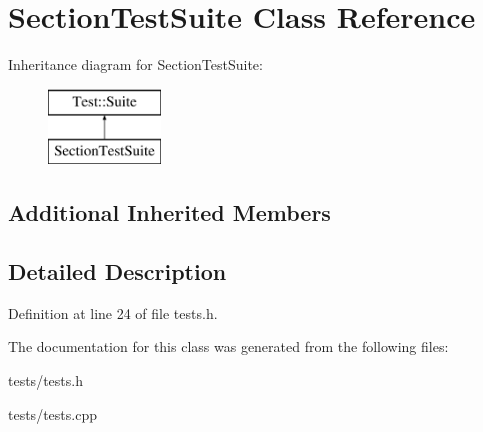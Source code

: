 \hypertarget{class_section_test_suite}{}\section{Section\+Test\+Suite Class Reference}
\label{class_section_test_suite}
Inheritance diagram for Section\+Test\+Suite\+:\begin{figure}[H]
\begin{center}
\leavevmode
\includegraphics[height=2.000000cm]{class_section_test_suite}
\end{center}
\end{figure}
\subsection*{Additional Inherited Members}


\subsection{Detailed Description}


Definition at line 24 of file tests.\+h.



The documentation for this class was generated from the following files\+:\begin{DoxyCompactItemize}
\item 
tests/tests.\+h\item 
tests/tests.\+cpp\end{DoxyCompactItemize}
